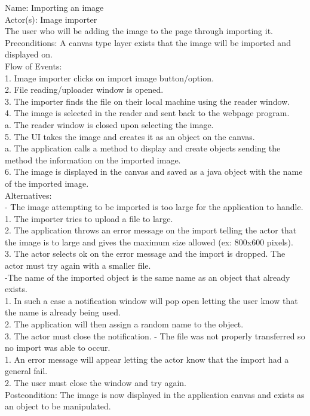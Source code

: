 \documentclass[12pt]{report}
\begin{document}
Name: Importing an image\\
Actor(s): Image importer\\
The user who will be adding the image to the page through importing it.\\
Preconditions: A canvas type layer exists that the image will be imported and displayed on.\\[0\baselineskip]

Flow of Events:\\
1.       Image importer clicks on import image button/option.\\
2.       File reading/uploader window is opened.\\
3.       The importer finds the file on their local machine using the reader window.\\
4.       The image is selected in the reader and sent back to the webpage program.\\
a.       The reader window is closed upon selecting the image.\\
5.        The UI takes the image and creates it as an object on the canvas.\\
a.       The application calls a method to display and create objects sending the method the information on the imported image.\\
6.       The image is displayed in the canvas and saved as a java object with the name of the imported image. \\[0\baselineskip]

Alternatives:\\
- The image attempting to be imported is too large for the application to handle. \\{\parindent 10pt} 1. The importer tries to upload a file to large.\\
2. The application throws an error message on the import 	telling the actor that the image is to large and gives the maximum size allowed (ex: 800x600 pixels). \\
3. The actor selects ok on the error message and the import is dropped. The actor must try again with a smaller file.\\
-The name of the imported object is the same name as an object that already exists.\\
1. In such a case a notification window will pop open letting the user know that the name is already being used. \\
2. The application will then assign a random name to the object.\\
3. The actor must close the notification.
- The file was not properly transferred so no import was able to occur.\\
1. An error message will appear letting the actor know that the import had a general fail. \\
2. The user must close the window and try again.\\
Postcondition:  The image is now displayed in the application canvas and exists as an object to be manipulated.
\end{document}
